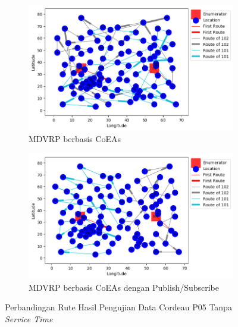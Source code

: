 \begin{figure}[!]
	\centering
	\begin{subfigure}[t]{\textwidth}
		\centering
		\includegraphics[width=\textwidth]{Resources/Images/test_result_cordeau_p05_notw_coes}
		\caption{MDVRP berbasis CoEAs}
		\label{fig:test_result_cordeau_p05_notw_coes}
	\end{subfigure}%
	
	\begin{subfigure}[t]{\textwidth}
		\centering
		\includegraphics[width=\textwidth]{Resources/Images/test_result_cordeau_p05_notw_pubsub_coes}
		\caption{MDVRP berbasis CoEAs dengan Publish/Subscribe}
		\label{fig:test_result_cordeau_p05_notw_pubsub_coes}
	\end{subfigure}
	\caption{Perbandingan Rute Hasil Pengujian Data Cordeau P05 Tanpa \textit{Service Time}}
	\label{fig:test_result_cordeau_p05_notw}
\end{figure}


